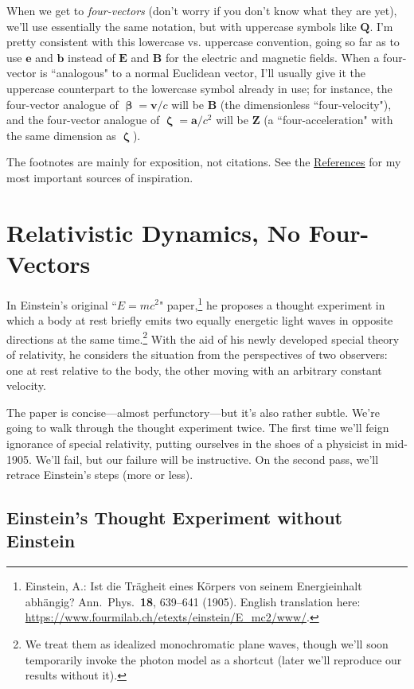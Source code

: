 \documentclass[12pt]{article}
\renewcommand{\vv}[1]{\mathbf{#1}}
\newcommand{\vvbeta}{\bm{\upbeta}}
\newcommand{\vvzeta}{\bm{\upzeta}}
\begin{document}
When we get to \emph{four-vectors} (don't worry if you don't know what they are yet), we'll use essentially the same notation, but with uppercase symbols like $\vv Q$. I'm pretty consistent with this lowercase vs. uppercase convention, going so far as to use $\vv e$ and $\vv b$ instead of $\vv E$ and $\vv B$ for the electric and magnetic fields. When a four-vector is ``analogous" to a normal Euclidean vector, I'll usually give it the uppercase counterpart to the lowercase symbol already in use; for instance, the four-vector analogue of $\vvbeta = \vv v / c$ will be $\vv B$ (the dimensionless ``four-velocity"), and the four-vector analogue of $\vvzeta = \vv a / c^2$ will be $\vv Z$ (a ``four-acceleration" with the same dimension as $\vvzeta$).

The footnotes are mainly for exposition, not citations. See the \hyperref[sec:r]{References} for my most important sources of inspiration.

\clearpage


\section{Relativistic Dynamics, No Four-Vectors}\label{sec:rd}


In Einstein's original ``$E=mc^2$" paper,\footnote{Einstein, A.: Ist die Tr\"agheit eines K\"orpers von seinem Energieinhalt abh\"angig? Ann.\ Phys.\ \textbf{18}, 639--641 (1905). English translation here: \url{https://www.fourmilab.ch/etexts/einstein/E_mc2/www/}.} he proposes a thought experiment in which a body at rest briefly emits two equally energetic light waves in opposite directions at the same time.\footnote{We treat them as idealized monochromatic plane waves, though we'll soon temporarily invoke the photon model as a shortcut (later we'll reproduce our results without it).} With the aid of his newly developed special theory of relativity, he considers the situation from the perspectives of two observers: one at rest relative to the body, the other moving with an arbitrary constant velocity.
 
The paper is concise---almost perfunctory---but it's also rather subtle. We're going to walk through the thought experiment twice. The first time we'll feign ignorance of special relativity, putting ourselves in the shoes of a physicist in mid-1905. We'll fail, but our failure will be instructive. On the second pass, we'll retrace Einstein's steps (more or less).


\subsection{Einstein's Thought Experiment without Einstein}
 
\end{document}
